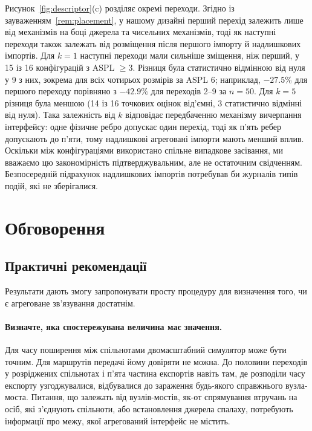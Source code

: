 Рисунок~\ref{fig:descriptor}(c) розділяє окремі переходи. Згідно із зауваженням~\ref{rem:placement}, у нашому дизайні перший перехід залежить лише від механізмів на боці джерела та чисельних механізмів, тоді як наступні переходи також залежать від розміщення після першого імпорту й надлишкових імпортів. Для $k=1$ наступні переходи мали сильніше зміщення, ніж перший, у 15 із 16 конфігурацій з ASPL $\ge3$. Різниця була статистично відмінною від нуля у 9 з них, зокрема для всіх чотирьох розмірів за ASPL 6; наприклад, $-27.5\%$ для першого переходу порівняно з $-42.9\%$ для переходів 2--9 за $n=50$. Для $k=5$ різниця була меншою (14 із 16 точкових оцінок від'ємні, 3 статистично відмінні від нуля). Така залежність від $k$ відповідає передбаченню механізму вичерпання інтерфейсу: одне фізичне ребро допускає один перехід, тоді як п'ять ребер допускають до п'яти, тому надлишкові агреговані імпорти мають менший вплив. Оскільки між конфігураціями використано спільне випадкове засівання, ми вважаємо цю закономірність підтверджувальним, але не остаточним свідченням. Безпосередній підрахунок надлишкових імпортів потребував би журналів типів подій, які не зберігалися.

\section{Обговорення}
\label{sec:discussion}

\subsection{Практичні рекомендації}

Результати дають змогу запропонувати просту процедуру для визначення того, чи є агреговане зв'язування достатнім.

\paragraph{Визначте, яка спостережувана величина має значення.}
Для часу поширення між спільнотами двомасштабний симулятор може бути точним. Для маршрутів передачі йому довіряти не можна. До половини переходів у розріджених спільнотах і п'ята частина експортів навіть там, де розподіли часу експорту узгоджувалися, відбувалися до зараження будь-якого справжнього вузла-моста. Питання, що залежать від вузлів-мостів, як-от спрямування втручань на осіб, які з'єднують спільноти, або встановлення джерела спалаху, потребують інформації про межу, якої агрегований інтерфейс не містить.

